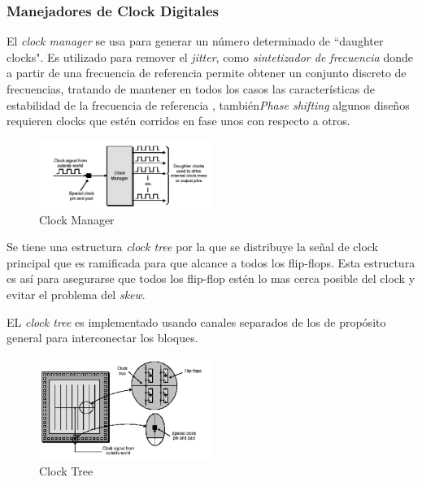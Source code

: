 \subsubsection{Manejadores de Clock Digitales}

El \textit{clock manager} se usa para generar un número determinado de “daughter clocks". Es utilizado para remover el \textit{jitter}, como \textit{sintetizador de frecuencia} donde a partir de una frecuencia de referencia permite obtener un conjunto discreto de frecuencias, tratando de mantener en todos los casos las características de estabilidad de la frecuencia de referencia \cite{Etiqueta03}, también\textit{Phase shifting} algunos diseños requieren clocks que estén corridos en fase unos con respecto a otros.

\begin{figure}[h!]
 \begin{center}
 \includegraphics[width=0.5\textwidth,keepaspectratio=true]{./images/dougther}
  \caption{Clock Manager}
  \label{fig:esquema}
 \end{center}
\end{figure}

Se tiene  una estructura \textit{clock tree} por la que se distribuye la señal de clock principal que es ramificada para que alcance a todos los flip-flops. Esta estructura es así para asegurarse que todos los flip-flop estén lo mas cerca posible del clock y evitar el problema del \textit{skew}.

EL \textit{clock tree} es implementado usando canales separados de los de propósito general para interconectar los bloques.

\begin{figure}[h!]
 \begin{center}
 \includegraphics[width=0.5\textwidth,keepaspectratio=true]{./images/clocktree}
  \caption{Clock Tree}
  \label{fig:esquema}
 \end{center}
\end{figure}


